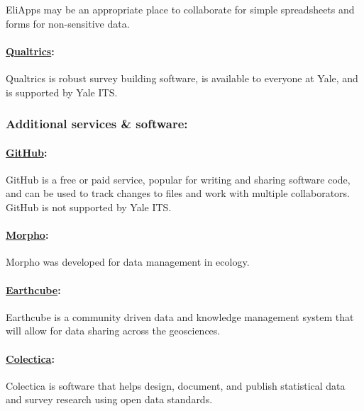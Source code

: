 \documentclass[]{article}
\begin{document}
EliApps may be an appropriate place to collaborate for simple
spreadsheets and forms for non-sensitive data.

\paragraph{\href{http://its.yale.edu/services/web-and-application-services/qualtrics-survey-tool}{Qualtrics}:}\label{qualtrics}

Qualtrics is robust survey building software, is available to everyone
at Yale, and is supported by Yale ITS.

\subsubsection{Additional services \&
software:}\label{additional-services-software}

\paragraph{\href{https://github.com/}{GitHub}:}\label{github}

GitHub is a free or paid service, popular for writing and sharing
software code, and can be used to track changes to files and work with
multiple collaborators. GitHub is not supported by Yale ITS.

\paragraph{\href{https://knb.ecoinformatics.org/morphoportal.jsp}{Morpho}:}\label{morpho}

Morpho was developed for data management in ecology.

\paragraph{\href{http://earthcube.org/}{Earthcube}:}\label{earthcube}

Earthcube is a community driven data and knowledge management system
that will allow for data sharing across the geosciences.

\paragraph{\href{http://www.colectica.com/}{Colectica}:}\label{colectica}

Colectica is software that helps design, document, and publish
statistical data and survey research using open data standards.
\end{document}

